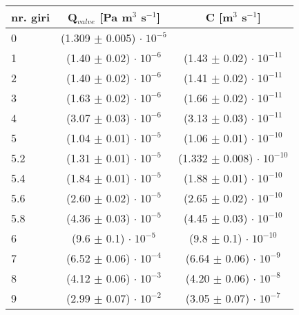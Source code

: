 \begin{center}
	\begin{tabular}{ l c c }
        \toprule
        nr. giri & Q$_{valve}$ [Pa m$^3$ s$^{-1}$] & C [m$^3$ s$^{-1}$] \\ 
        \midrule
        0   & (1.309 $\pm$ 0.005) $ \cdot \; 10^{-5}$ & \\
        1   & (1.40 $\pm$ 0.02) $ \cdot \; 10^{-6}$ & (1.43 $\pm$  0.02) $ \cdot \; 10^{-11}$ \\
        2   & (1.40 $\pm$ 0.02) $ \cdot \; 10^{-6}$ & (1.41 $\pm$  0.02) $ \cdot \; 10^{-11}$ \\
        3   & (1.63 $\pm$ 0.02) $ \cdot \; 10^{-6}$ & (1.66 $\pm$  0.02) $ \cdot \; 10^{-11}$ \\
        4   & (3.07 $\pm$ 0.03) $ \cdot \; 10^{-6}$ & (3.13 $\pm$  0.03) $ \cdot \; 10^{-11}$ \\
        5   & (1.04 $\pm$ 0.01) $ \cdot \; 10^{-5}$ & (1.06 $\pm$  0.01) $ \cdot \; 10^{-10}$ \\
        5.2 & (1.31 $\pm$ 0.01) $ \cdot \; 10^{-5}$ & (1.332 $\pm$ 0.008) $ \cdot \; 10^{-10}$ \\
        5.4 & (1.84 $\pm$ 0.01) $ \cdot \; 10^{-5}$ & (1.88 $\pm$  0.01) $ \cdot \; 10^{-10}$ \\
        5.6 & (2.60 $\pm$ 0.02) $ \cdot \; 10^{-5}$ & (2.65 $\pm$  0.02) $ \cdot \; 10^{-10}$ \\
        5.8 & (4.36 $\pm$ 0.03) $ \cdot \; 10^{-5}$ & (4.45 $\pm$  0.03) $ \cdot \; 10^{-10}$ \\
        6   &  (9.6 $\pm$ 0.1)  $ \cdot \; 10^{-5}$ & (9.8 $\pm$   0.1) $ \cdot \; 10^{-10}$ \\
        7   & (6.52 $\pm$ 0.06) $ \cdot \; 10^{-4}$ & (6.64 $\pm$  0.06) $ \cdot \; 10^{-9}$ \\
        8   & (4.12 $\pm$ 0.06) $ \cdot \; 10^{-3}$ & (4.20 $\pm$  0.06) $ \cdot \; 10^{-8}$ \\
        9   & (2.99 $\pm$ 0.07) $ \cdot \; 10^{-2}$ & (3.05 $\pm$  0.07) $ \cdot \; 10^{-7}$ \\
    \bottomrule

	\end{tabular}
\end{center}
